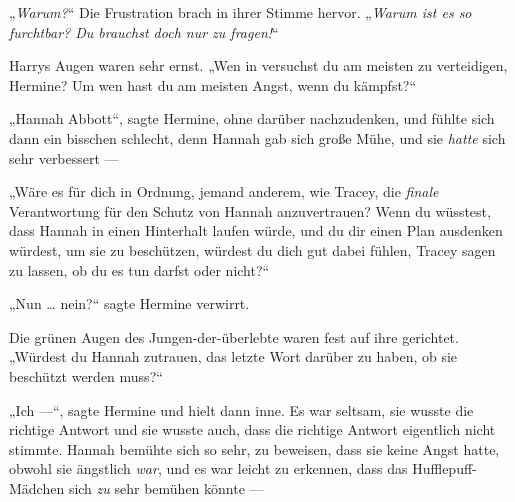 „\emph{Warum?}“ Die Frustration brach in ihrer Stimme hervor.
„\emph{Warum ist es so furchtbar? Du brauchst doch nur zu fragen!}“

Harrys Augen waren sehr ernst.
„Wen in \SPHEW versuchst du am meisten zu verteidigen, Hermine? Um wen hast du am meisten Angst, wenn du kämpfst?“

„Hannah Abbott“, sagte Hermine, ohne darüber nachzudenken, und fühlte sich dann ein bisschen schlecht, denn Hannah gab sich große Mühe, und sie \emph{hatte} sich sehr verbessert —

„Wäre es für dich in Ordnung, jemand anderem, wie Tracey, die \emph{finale} Verantwortung für den Schutz von Hannah anzuvertrauen? Wenn du wüsstest, dass Hannah in einen Hinterhalt laufen würde, und du dir einen Plan ausdenken würdest, um sie zu beschützen, würdest du dich gut dabei fühlen, Tracey sagen zu lassen, ob du es tun darfst oder nicht?“

„Nun … nein?“ sagte Hermine verwirrt.

Die grünen Augen des Jungen-der-überlebte waren fest auf ihre gerichtet.
„Würdest du Hannah zutrauen, das letzte Wort darüber zu haben, ob sie beschützt werden muss?“

„Ich —“, sagte Hermine und hielt dann inne. Es war seltsam, sie wusste die richtige Antwort und sie wusste auch, dass die richtige Antwort eigentlich nicht stimmte. Hannah bemühte sich so sehr, zu beweisen, dass sie keine Angst hatte, obwohl sie ängstlich \emph{war}, und es war leicht zu erkennen, dass das Hufflepuff-Mädchen sich \emph{zu} sehr bemühen könnte —


